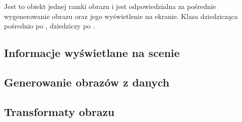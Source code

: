 \label{sec:sokar-dicomscene}

Jest to obiekt jednej ramki obrazu i jest odpowiedzialna za pośrednie wygenerowanie obrazu oraz jego wyświetlenie na ekranie.
Klasa dziedzicząca pośrednio po ,  dziedziczy po .

\subsection{Informacje wyświetlane na scenie}


\subsection{Generowanie obrazów z danych}


\subsection{Transformaty obrazu}
